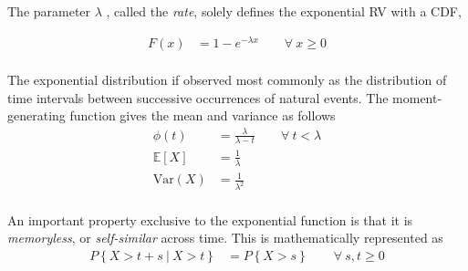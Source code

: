 \begin{figure}[H]
\end{figure}


The parameter $ \lambda $ , called the \textit{rate}, solely defines the exponential RV with a CDF,

\begin{align}
	F(x) &= 1 - e^{-\lambda x} \qquad \forall \ x \geq 0
\end{align}\\

The exponential distribution if observed most commonly as the distribution of time intervals between successive occurrences of natural events. The moment-generating function gives the mean and variance as follows \\

\begin{align}
	\phi(t) &= \frac{\lambda}{\lambda - t} \qquad \forall\ t < \lambda \\[1ex]
	\mathbb{E}[X] &= \frac{1}{\lambda} \\[1ex]
	\mathrm{Var}(X) &= \frac{1}{\lambda^2}
\end{align}\\

An important property exclusive to the exponential function is that it is \textit{memoryless}, or \textit{self-similar} across time. This is mathematically represented as\\

\begin{align}
	P \left\{X > t+s\ |\ X > t \right\} &= P \left\{X > s \right\} \qquad \forall \ s, t\geq 0
\end{align} \\

